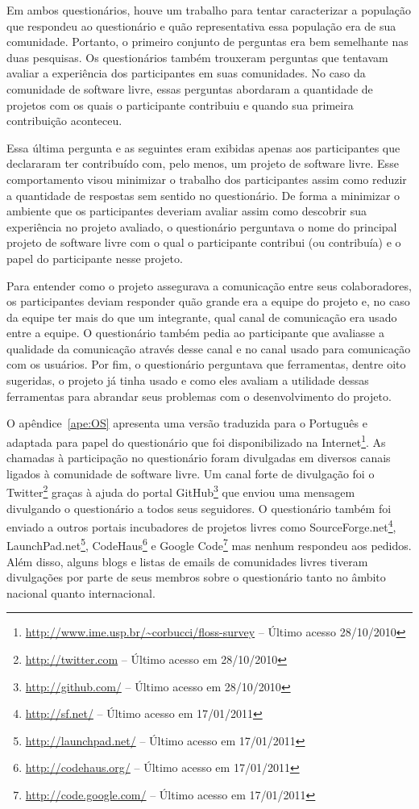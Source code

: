 Em ambos questionários, houve um trabalho para tentar caracterizar a
população que respondeu ao questionário e quão representativa essa
população era de sua comunidade. Portanto, o primeiro conjunto de
perguntas era bem semelhante nas duas pesquisas. Os questionários
também trouxeram perguntas que tentavam avaliar a experiência dos
participantes em suas comunidades. No caso da comunidade de software
livre, essas perguntas abordaram a quantidade de projetos com os quais
o participante contribuiu e quando sua primeira contribuição
aconteceu.

Essa última pergunta e as seguintes eram exibidas apenas aos
participantes que declararam ter contribuído com, pelo menos, um
projeto de software livre. Esse comportamento visou minimizar o
trabalho dos participantes assim como reduzir a quantidade de
respostas sem sentido no questionário. De forma a minimizar o ambiente
que os participantes deveriam avaliar assim como descobrir sua
experiência no projeto avaliado, o questionário perguntava o nome do
principal projeto de software livre com o qual o participante
contribui (ou contribuía) e o papel do participante nesse projeto.

Para entender como o projeto assegurava a comunicação entre seus
colaboradores, os participantes deviam responder quão grande era a
equipe do projeto e, no caso da equipe ter mais do que um integrante,
qual canal de comunicação era usado entre a equipe. O questionário
também pedia ao participante que avaliasse a qualidade da comunicação
através desse canal e no canal usado para comunicação com os usuários.
Por fim, o questionário perguntava que ferramentas, dentre oito
sugeridas, o projeto já tinha usado e como eles avaliam a utilidade
dessas ferramentas para abrandar seus problemas com o desenvolvimento
do projeto.

O apêndice~\ref{ape:OS} apresenta uma versão traduzida para o
Português e adaptada para papel do questionário que foi
disponibilizado na
Internet\footnote{\url{http://www.ime.usp.br/~corbucci/floss-survey}
  -- Último acesso 28/10/2010}. As chamadas à participação no
questionário foram divulgadas em diversos canais ligados à comunidade
de software livre. Um canal forte de divulgação foi o
Twitter\footnote{\url{http://twitter.com} -- Último acesso em
  28/10/2010} graças à ajuda do portal
GitHub\footnote{\url{http://github.com/} -- Último acesso em
  28/10/2010} que enviou uma mensagem divulgando o questionário a
todos seus seguidores. O questionário também foi enviado a outros
portais incubadores de projetos livres como
SourceForge.net\footnote{\url{http://sf.net/} -- Último acesso em
  17/01/2011}, LaunchPad.net\footnote{\url{http://launchpad.net/} --
  Último acesso em 17/01/2011},
CodeHaus\footnote{\url{http://codehaus.org/} -- Último acesso em
  17/01/2011} e Google Code\footnote{\url{http://code.google.com/} --
  Último acesso em 17/01/2011} mas nenhum respondeu aos pedidos. Além
disso, alguns blogs e listas de emails de comunidades livres tiveram
divulgações por parte de seus membros sobre o questionário tanto no
âmbito nacional quanto internacional.

